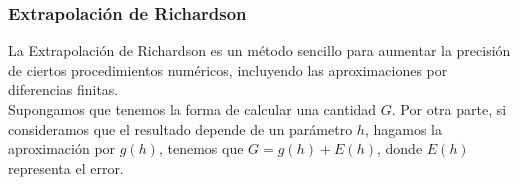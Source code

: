 \documentclass[12pt]{beamer}
\begin{document}
\begin{frame}
\frametitle{Extrapolación de Richardson}
La Extrapolación de Richardson es un método sencillo para aumentar la precisión de ciertos procedimientos numéricos, incluyendo las aproximaciones por diferencias finitas.
\\
\bigskip
\pause
Supongamos que tenemos la forma de calcular una cantidad $G$. Por otra parte, si consideramos que el resultado depende de un parámetro $h$, hagamos la aproximación por $g (h)$, tenemos que $G = g (h) + E (h)$, donde $E (h)$ representa el error.
\end{frame}
\end{document}
